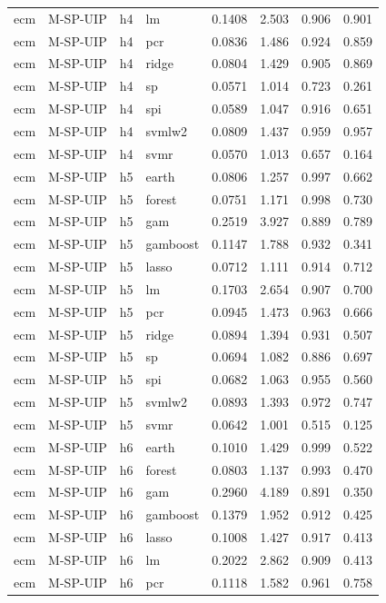 \begin{ThreePartTable}
\begin{longtable}[t]{llclcccc}
ecm & M-SP-UIP & h4 & lm & 0.1408 & 2.503 & 0.906 & 0.901\\
ecm & M-SP-UIP & h4 & pcr & 0.0836 & 1.486 & 0.924 & 0.859\\
ecm & M-SP-UIP & h4 & ridge & 0.0804 & 1.429 & 0.905 & 0.869\\
ecm & M-SP-UIP & h4 & sp & 0.0571 & 1.014 & 0.723 & 0.261\\
ecm & M-SP-UIP & h4 & spi & 0.0589 & 1.047 & 0.916 & 0.651\\
ecm & M-SP-UIP & h4 & svmlw2 & 0.0809 & 1.437 & 0.959 & 0.957\\
ecm & M-SP-UIP & h4 & svmr & 0.0570 & 1.013 & 0.657 & 0.164\\
\addlinespace
ecm & M-SP-UIP & h5 & earth & 0.0806 & 1.257 & 0.997 & 0.662\\
ecm & M-SP-UIP & h5 & forest & 0.0751 & 1.171 & 0.998 & 0.730\\
ecm & M-SP-UIP & h5 & gam & 0.2519 & 3.927 & 0.889 & 0.789\\
ecm & M-SP-UIP & h5 & gamboost & 0.1147 & 1.788 & 0.932 & 0.341\\
ecm & M-SP-UIP & h5 & lasso & 0.0712 & 1.111 & 0.914 & 0.712\\
ecm & M-SP-UIP & h5 & lm & 0.1703 & 2.654 & 0.907 & 0.700\\
ecm & M-SP-UIP & h5 & pcr & 0.0945 & 1.473 & 0.963 & 0.666\\
ecm & M-SP-UIP & h5 & ridge & 0.0894 & 1.394 & 0.931 & 0.507\\
ecm & M-SP-UIP & h5 & sp & 0.0694 & 1.082 & 0.886 & 0.697\\
ecm & M-SP-UIP & h5 & spi & 0.0682 & 1.063 & 0.955 & 0.560\\
ecm & M-SP-UIP & h5 & svmlw2 & 0.0893 & 1.393 & 0.972 & 0.747\\
ecm & M-SP-UIP & h5 & svmr & 0.0642 & 1.001 & 0.515 & 0.125\\
\addlinespace
ecm & M-SP-UIP & h6 & earth & 0.1010 & 1.429 & 0.999 & 0.522\\
ecm & M-SP-UIP & h6 & forest & 0.0803 & 1.137 & 0.993 & 0.470\\
ecm & M-SP-UIP & h6 & gam & 0.2960 & 4.189 & 0.891 & 0.350\\
ecm & M-SP-UIP & h6 & gamboost & 0.1379 & 1.952 & 0.912 & 0.425\\
ecm & M-SP-UIP & h6 & lasso & 0.1008 & 1.427 & 0.917 & 0.413\\
ecm & M-SP-UIP & h6 & lm & 0.2022 & 2.862 & 0.909 & 0.413\\
ecm & M-SP-UIP & h6 & pcr & 0.1118 & 1.582 & 0.961 & 0.758\\

\end{longtable}
\end{ThreePartTable}
